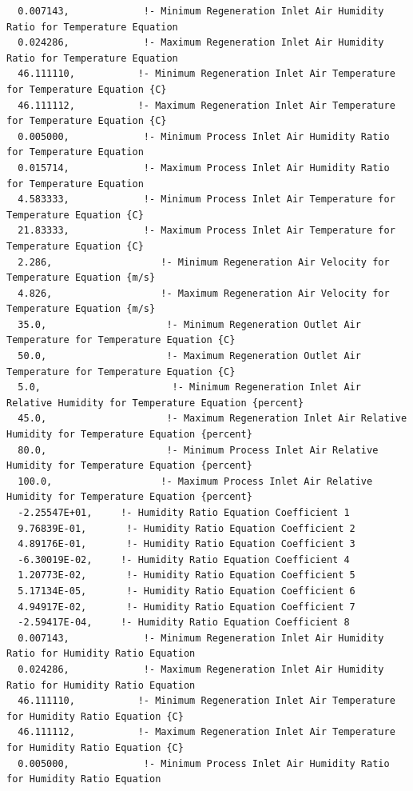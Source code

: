 \begin{lstlisting}
  0.007143,             !- Minimum Regeneration Inlet Air Humidity Ratio for Temperature Equation
  0.024286,             !- Maximum Regeneration Inlet Air Humidity Ratio for Temperature Equation
  46.111110,           !- Minimum Regeneration Inlet Air Temperature for Temperature Equation {C}
  46.111112,           !- Maximum Regeneration Inlet Air Temperature for Temperature Equation {C}
  0.005000,             !- Minimum Process Inlet Air Humidity Ratio for Temperature Equation
  0.015714,             !- Maximum Process Inlet Air Humidity Ratio for Temperature Equation
  4.583333,             !- Minimum Process Inlet Air Temperature for Temperature Equation {C}
  21.83333,             !- Maximum Process Inlet Air Temperature for Temperature Equation {C}
  2.286,                   !- Minimum Regeneration Air Velocity for Temperature Equation {m/s}
  4.826,                   !- Maximum Regeneration Air Velocity for Temperature Equation {m/s}
  35.0,                     !- Minimum Regeneration Outlet Air Temperature for Temperature Equation {C}
  50.0,                     !- Maximum Regeneration Outlet Air Temperature for Temperature Equation {C}
  5.0,                       !- Minimum Regeneration Inlet Air Relative Humidity for Temperature Equation {percent}
  45.0,                     !- Maximum Regeneration Inlet Air Relative Humidity for Temperature Equation {percent}
  80.0,                     !- Minimum Process Inlet Air Relative Humidity for Temperature Equation {percent}
  100.0,                   !- Maximum Process Inlet Air Relative Humidity for Temperature Equation {percent}
  -2.25547E+01,     !- Humidity Ratio Equation Coefficient 1
  9.76839E-01,       !- Humidity Ratio Equation Coefficient 2
  4.89176E-01,       !- Humidity Ratio Equation Coefficient 3
  -6.30019E-02,     !- Humidity Ratio Equation Coefficient 4
  1.20773E-02,       !- Humidity Ratio Equation Coefficient 5
  5.17134E-05,       !- Humidity Ratio Equation Coefficient 6
  4.94917E-02,       !- Humidity Ratio Equation Coefficient 7
  -2.59417E-04,     !- Humidity Ratio Equation Coefficient 8
  0.007143,             !- Minimum Regeneration Inlet Air Humidity Ratio for Humidity Ratio Equation
  0.024286,             !- Maximum Regeneration Inlet Air Humidity Ratio for Humidity Ratio Equation
  46.111110,           !- Minimum Regeneration Inlet Air Temperature for Humidity Ratio Equation {C}
  46.111112,           !- Maximum Regeneration Inlet Air Temperature for Humidity Ratio Equation {C}
  0.005000,             !- Minimum Process Inlet Air Humidity Ratio for Humidity Ratio Equation

\end{lstlisting}
